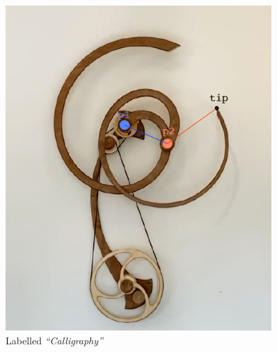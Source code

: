 \documentclass[a4paper,12pt]{article}
\begin{document}
\begin{figure}[H]
\begin{minipage}{0.45\textwidth}
        \includegraphics[width=0.9\textwidth]{labelled_sculpt} %
        \caption{Labelled \textit{“Calligraphy”}}
        \label{fig:lbcalli}
    \end{minipage}
\end{figure}
\end{document}
